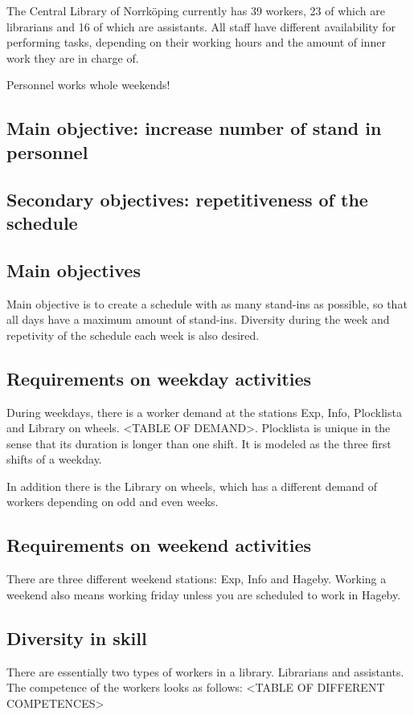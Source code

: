 The Central Library of Norrköping currently has 39 workers, 23 of which are librarians and 16 of which are assistants. All staff have different availability for performing tasks, depending on their working hours and the amount of inner work they are in charge of.

Personnel works whole weekends!

\subsection{Main objective: increase number of stand in personnel}

\subsection{Secondary objectives: repetitiveness of the schedule}


\iffalse
\subsection{Main objectives}
Main objective is to create a schedule with as many stand-ins as possible, so that all days have a maximum amount of stand-ins. Diversity during the week and repetivity of the schedule each week is also desired.

\subsection{Requirements on weekday activities}
During weekdays, there is a worker demand at the stations Exp, Info, Plocklista and Library on wheels. <TABLE OF DEMAND>. Plocklista is unique in the sense that its duration is longer than one shift. It is modeled as the three first shifts of a weekday.

In addition there is the Library on wheels, which has a different demand of workers depending on odd and even weeks. 
\subsection{Requirements on weekend activities}
There are three different weekend stations: Exp, Info and Hageby. Working a weekend also means working friday unless you are scheduled to work in Hageby. 
\subsection{Diversity in skill}
There are essentially two types of workers in a library. Librarians and assistants. The competence of the workers looks as follows: <TABLE OF DIFFERENT COMPETENCES>

